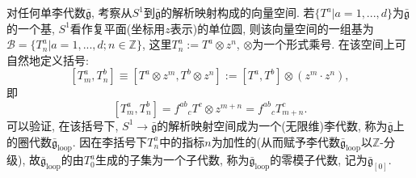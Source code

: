 \documentclass{ctexart}%
\theoremstyle{definition}
\theoremstyle{remark}
\begin{document}
对任何单李代数$\bar{\mathfrak{g}}$, 考察从$S^1$到$\bar{\mathfrak{g}}$的解析映射构成的向量空间. 若$\{T^a|a=1,...,d\}$为$\bar{\mathfrak{g}}$的一个基, $S^1$看作复平面(坐标用$z$表示)的单位圆, 则该向量空间的一组基为$\mathcal{B}=\{T^a_n|a=1,...,d; n\in \mathbb{Z}\}$, 这里$T^a_n:=T^a\otimes z^n$, $\otimes$为一个形式乘号. 在该空间上可自然地定义括号:
$$[T^a_m, T^b_n] \equiv [T^a\otimes z^m, T^b\otimes z^n]:=[T^a,T^b]\otimes(z^m\cdot z^n),$$
即
$$[T^a_m,T^b_n]=f^{ab}{}_cT^c \otimes z^{m+n} = f^{ab}{}_c T^c_{m+n}.$$
可以验证, 在该括号下, $S^1\rightarrow \bar{\mathfrak{g}}$的解析映射空间成为一个(无限维)李代数, 称为$\bar{\mathfrak{g}}$上的圈代数$\bar{\mathfrak{g}}_{\text{loop}}$. 因在李括号下$T^a_n$中的指标$n$为加性的(从而赋予李代数$\bar{\mathfrak{g}}_{\text{loop}}$以$\mathbb{Z}$-分级), 故$\bar{\mathfrak{g}}_{\text{loop}}$的由$T^a_0$生成的子集为一个子代数, 称为$\bar{\mathfrak{g}}_{\text{loop}}$的零模子代数, 记为$\bar{\mathfrak{g}}_{[0]}$.
\end{document}
